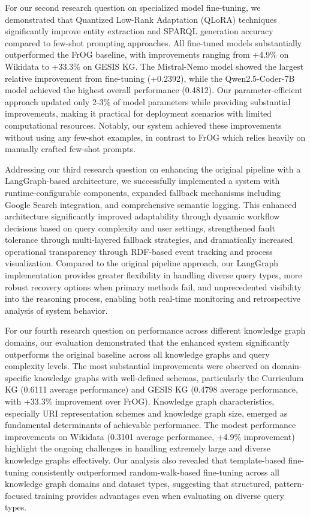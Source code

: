 For our second research question on specialized model fine-tuning, we demonstrated that Quantized Low-Rank Adaptation (QLoRA) techniques significantly improve entity extraction and SPARQL generation accuracy compared to few-shot prompting approaches. All fine-tuned models substantially outperformed the FrOG baseline, with improvements ranging from +4.9\% on Wikidata to +33.3\% on GESIS KG. The Mistral-Nemo model showed the largest relative improvement from fine-tuning (+0.2392), while the Qwen2.5-Coder-7B model achieved the highest overall performance (0.4812). Our parameter-efficient approach updated only 2-3\% of model parameters while providing substantial improvements, making it practical for deployment scenarios with limited computational resources. Notably, our system achieved these improvements without using any few-shot examples, in contrast to FrOG which relies heavily on manually crafted few-shot prompts.

Addressing our third research question on enhancing the original pipeline with a LangGraph-based architecture, we successfully implemented a system with runtime-configurable components, expanded fallback mechanisms including Google Search integration, and comprehensive semantic logging. This enhanced architecture significantly improved adaptability through dynamic workflow decisions based on query complexity and user settings, strengthened fault tolerance through multi-layered fallback strategies, and dramatically increased operational transparency through RDF-based event tracking and process visualization. Compared to the original pipeline approach, our LangGraph implementation provides greater flexibility in handling diverse query types, more robust recovery options when primary methods fail, and unprecedented visibility into the reasoning process, enabling both real-time monitoring and retrospective analysis of system behavior.

For our fourth research question on performance across different knowledge graph domains, our evaluation demonstrated that the enhanced system significantly outperforms the original baseline across all knowledge graphs and query complexity levels. The most substantial improvements were observed on domain-specific knowledge graphs with well-defined schemas, particularly the Curriculum KG (0.6111 average performance) and GESIS KG (0.4798 average performance, with +33.3\% improvement over FrOG). Knowledge graph characteristics, especially URI representation schemes and knowledge graph size, emerged as fundamental determinants of achievable performance. The modest performance improvements on Wikidata (0.3101 average performance, +4.9\% improvement) highlight the ongoing challenges in handling extremely large and diverse knowledge graphs effectively. Our analysis also revealed that template-based fine-tuning consistently outperformed random-walk-based fine-tuning across all knowledge graph domains and dataset types, suggesting that structured, pattern-focused training provides advantages even when evaluating on diverse query types.

